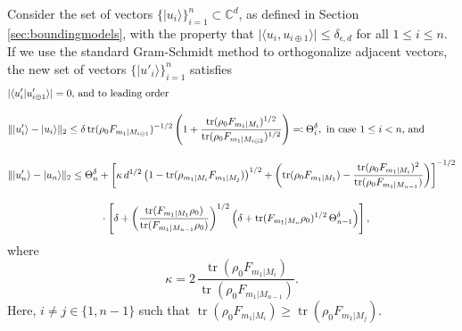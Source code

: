 \begin{lemma}
\label{lem:orthogonalize}
Consider the set of vectors $\{\vert u_i \rangle\}_{i=1}^{n}\subset \mathbb{C}^d$, as defined in Section \ref{sec:boundingmodels}, with the property that $\vert \langle u_i , u_{i\oplus 1}\rangle \vert \leq \delta_{\epsilon, d}$ for all $1\leq i \leq n$. If we use the standard Gram-Schmidt method to orthogonalize adjacent vectors, the new set of vectors $\{\vert u'_i \rangle \}_{i=1}^{n}$ satisfies
\begin{equation*}
\label{eqn:orthlem}
\begin{split}
& \vert \langle u'_i \vert u'_{i\oplus 1}\rangle\vert  = 0 \text{, and to leading order}\\[1em] 
& \|\vert u'_i \rangle - \vert u_i \rangle \|_2 \leq \delta\operatorname{tr}(\rho_0 F_{m_1\vert M_{i\ominus 1}})^{-1/2}\left(1+\frac{\operatorname{tr}(\rho_0 F_{m_1\vert M_{i}})^{1/2}}{\operatorname{tr}(\rho_0 F_{m_1\vert M_{i\ominus 2}})^{1/2}}\right)\eqqcolon \Theta_i^{\delta}, \text{ in case $1\leq i<n$, and} \\[1em]
& \|\vert u'_n \rangle - \vert u_n\rangle \|_2 \leq \Theta_n^{\delta} + \left[\kappa\, d^{1/2}\left(1-\operatorname{tr}(\rho_{m_1\vert M_i } F_{m_1\vert M_j})\right)^{1/2}
+ \left(\operatorname{tr}(\rho_0 F_{m_1\vert M_1})-\frac{\operatorname{tr}(\rho_0 F_{m_1\vert M_i})^2}{\operatorname{tr}(\rho_0 F_{m_1\vert M_{n-1}})}\right)\right]^{-1/2}\\[1em]&\hspace{9.1em}\cdot \left[\delta +  \left(\frac{\operatorname{tr}(F_{m_1\vert M_1}\rho_0)}{\operatorname{tr}(F_{m_1\vert M_{n-1}}\rho_0)}\right)^{1/2}\left( \delta + \operatorname{tr}(F_{m_1\vert M_n}\rho_0)^{1/2}\,\Theta_{n-1}^{\delta} \right)\right],
\end{split}
\end{equation*}
where \[\kappa=2\, \frac{\operatorname{tr}(\rho_0 F_{m_1\vert M_{i}})}{\operatorname{tr}(\rho_0 F_{m_1\vert M_{n-1}})}.\]
Here, $i\neq j \in \{1,n-1\}$ such that $\operatorname{tr}(\rho_0 F_{m_1\vert M_i})\geq \operatorname{tr}(\rho_0 F_{m_1\vert M_j})$.
\end{lemma}
